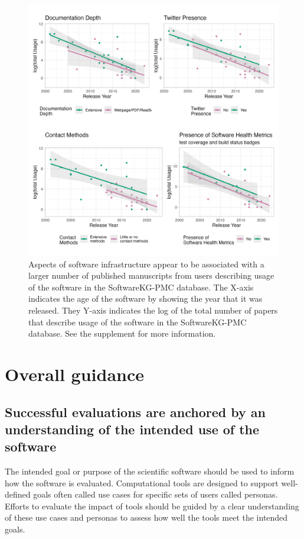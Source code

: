 \documentclass{article}
\begin{document}
\begin{figure}[ht]
    \centering
\includegraphics[width=\textwidth,height=\textheight,keepaspectratio]{images/logUsage_stratified_2x2.png}
    \caption{Aspects of software infrastructure appear to be associated with a larger number of published manuscripts from users describing usage of the software in the SoftwareKG-PMC database. The X-axis indicates the age of the software by showing the year that it was released. They Y-axis indicates the log of the total number of papers that describe usage of the software in the SoftwareKG-PMC database. See the supplement for more information.}
    \label{fig:inf_cit}
\end{figure}



\section{Overall guidance}





\subsection{Successful evaluations are anchored by an understanding of the intended use of the software}
\label{sec:use_understanding}
The intended goal or purpose of the scientific software should be used to inform how the software is evaluated. Computational tools are designed to support well-defined goals often called use cases \cite{gamma_design_1995} for specific sets of users called personas\cite{cooper_inmates_2004}. Efforts to evaluate the impact of tools should be guided by a clear understanding of these use cases and personas to assess how well the tools meet the intended goals.  
\end{document}
